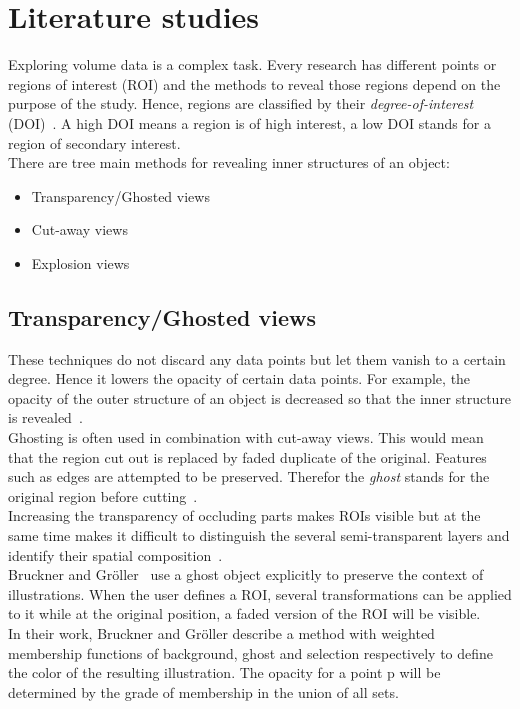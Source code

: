 
\section{Literature studies}

Exploring volume data is a complex task. Every research has different points or regions of interest (ROI) and the methods to reveal those regions depend on the purpose of the study. Hence, regions are classified by their \emph{degree-of-interest} (DOI)~\cite{proc:intelligentCutaway}. A high DOI means a region is of high interest, a low DOI stands for a region of secondary interest.\\
There are tree main methods for revealing inner structures of an object:
\begin{itemize}
	\item Transparency/Ghosted views
	\item Cut-away views
	\item Explosion views
\end{itemize}

\subsection{Transparency/Ghosted views}
These techniques do not discard any data points but let them vanish to a certain degree. Hence it lowers the opacity of certain data points. For example, the opacity of the outer structure of an object is decreased so that the inner structure is revealed~\cite{jour:correa}.\\
Ghosting is often used in combination with cut-away views. This would mean that the region cut out is replaced by faded duplicate of the original. Features such as edges are attempted to be preserved. Therefor the \emph{ghost} stands for the original region before cutting~\cite{proc:volumeshop}.\\
Increasing the transparency of occluding parts makes ROIs visible but at the same time makes it difficult to distinguish the several semi-transparent layers and identify their spatial composition~\cite{jour:interactiveCutaway}.\\
Bruckner and Gr{\"o}ller~\cite{proc:volumeshop} use a ghost object explicitly to preserve the context of illustrations. When the user defines a ROI, several transformations can be applied to it while at the original position, a faded version of the ROI will be visible.\\
In their work, Bruckner and Gr{\"o}ller describe a method with weighted membership functions of background, ghost and selection respectively to define the color of the resulting illustration. The opacity for a point p will be determined by the grade of membership in the union of all sets.

